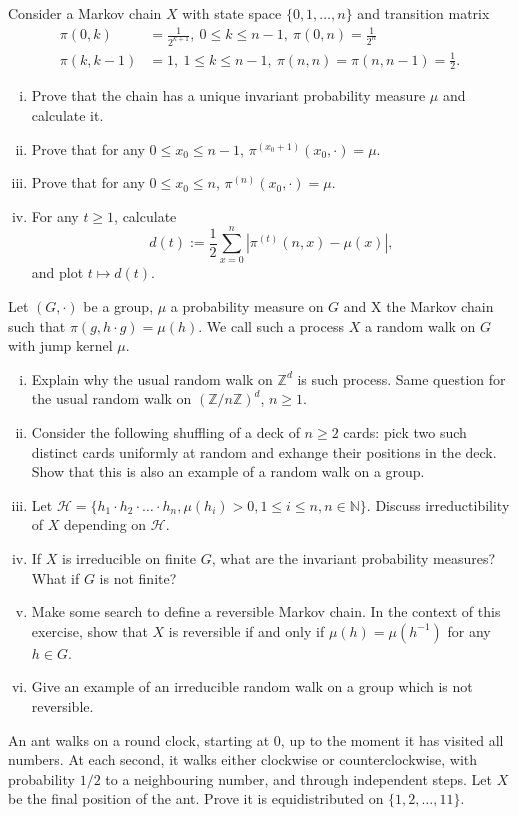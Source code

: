 \documentclass[11pt,reqno]{amsart}
\newcommand{\1}{\mathds{1}}
\theoremstyle{definition}
\theoremstyle{remark}
\numberwithin{equation}{section}
\begin{document}
 Consider a Markov chain $X$ with state space $\{0,1,\dots,n\}$ and transition matrix 
\begin{align*}
\pi(0,k)&=\frac{1}{2^{k+1}},\ 0\leq k\leq n-1,\ \pi(0,n)=\frac{1}{2^n}\\
\pi(k,k-1)&=1,\ 1\leq k\leq n-1,\ \pi(n,n)=\pi(n,n-1)=\frac{1}{2}.
\end{align*}
\begin{enumerate}[(i)]
\item Prove that the chain has a unique invariant probability measure $\mu$ and calculate it.
\item Prove that for any $0\leq x_0\leq n-1$,  $\pi^{(x_0+1)}(x_0,\cdot)=\mu$.
\item Prove that for any $0\leq x_0\leq n$,  $\pi^{(n)}(x_0,\cdot)=\mu$.
\item For any $t\geq 1$, calculate 
$$
d(t):=\frac{1}{2}\sum_{x=0}^n\left|
\pi^{(t)}(n,x)-\mu(x)
\right|,
$$ 
and plot $t\mapsto d(t)$.
\end{enumerate}




 Let $(G,\cdot)$ be a group,  $\mu$ a probability measure on $G$ and X the Markov chain such that $\pi(g,h\cdot g)=\mu(h)$. We call such a process $X$ a random walk on $G$ with jump kernel $\mu$.
\begin{enumerate}[(i)]
\item Explain why the usual random walk on $\mathbb{Z}^d$ is such process. Same question for the usual random walk on $(\mathbb{Z}/n\mathbb{Z})^d$, $n\geq 1$.
\item Consider the following shuffling of a deck of $n\geq 2$ cards: pick two such distinct cards uniformly at random and exhange their positions in the deck. Show that this is also an example of a random walk on a group.
\item Let $\mathcal{H}=\{h_1\cdot h_2\cdot\dots\cdot h_n,\mu(h_i)>0, 1\leq i\leq n,n\in\mathbb{N}\}$.  Discuss irreductibility of $X$ depending on $\mathcal{H}$.
\item If $X$ is irreducible on finite $G$, what are the invariant probability measures? What if $G$ is not finite?
\item Make some search to define a reversible Markov chain. In the context of this exercise, show that $X$ is reversible if and only if $\mu(h)=\mu(h^{-1})$ for any $h\in G$.
\item Give an example of an irreducible random walk on a group which is not reversible.
\end{enumerate}


An ant walks on a round clock, starting at 0, up to the moment it has visited all numbers.  At each second,  it walks either clockwise or counterclockwise,   with probability $1/2$ to a neighbouring number,  and through independent steps.  Let $X$ be the final position of the ant. Prove it is equidistributed on $\{1,2,\dots,11\}$.\\
\end{document}
